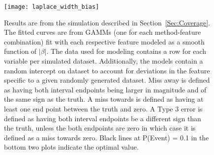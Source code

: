  

\begin{figure}[hbtp]
  \begin{center}
  \texttt{[image: laplace\_width\_bias]}
  \caption{\label{Fig:laplace_width_bias} Results are from the simulation described in Section~\ref{Sec:Coverage}. The fitted curves are from GAMMs (one for each method-feature combination) fit with each respective feature modeled as a smooth function of $|\beta|$. The data used for modeling contains a row for each variable per simulated dataset. Additionally, the models contain a random intercept on dataset to account for deviations in the feature specific to a given randomly generated dataset. Miss away is defined as having both interval endpoints being larger in magnitude and of the same sign as the truth. A miss towards is defined as having at least one end point between the truth and zero. A Type 3 error is defined as having both interval endpoints be a different sign than the truth, unless the both endpoints are zero in which case it is defined as a miss towards zero. Black lines at P(Event) = 0.1 in the bottom two plots indicate the optimal value.}
  \end{center}
\end{figure}


